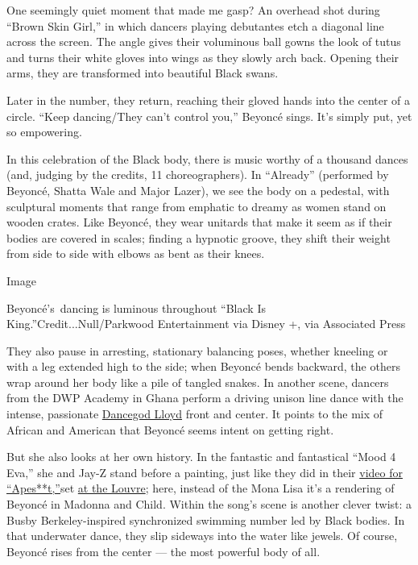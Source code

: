 One seemingly quiet moment that made me gasp? An overhead shot during
``Brown Skin Girl,'' in which dancers playing debutantes etch a diagonal
line across the screen. The angle gives their voluminous ball gowns the
look of tutus and turns their white gloves into wings as they slowly
arch back. Opening their arms, they are transformed into beautiful Black
swans.

Later in the number, they return, reaching their gloved hands into the
center of a circle. ``Keep dancing/They can't control you,'' Beyoncé
sings. It's simply put, yet so empowering.

In this celebration of the Black body, there is music worthy of a
thousand dances (and, judging by the credits, 11 choreographers). In
``Already'' (performed by Beyoncé, Shatta Wale and Major Lazer), we see
the body on a pedestal, with sculptural moments that range from emphatic
to dreamy as women stand on wooden crates. Like Beyoncé, they wear
unitards that make it seem as if their bodies are covered in scales;
finding a hypnotic groove, they shift their weight from side to side
with elbows as bent as their knees.

Image

Beyoncé's~dancing is luminous throughout ``Black Is
King.''Credit...Null/Parkwood Entertainment via Disney +, via Associated
Press

They also pause in arresting, stationary balancing poses, whether
kneeling or with a leg extended high to the side; when Beyoncé bends
backward, the others wrap around her body like a pile of tangled snakes.
In another scene, dancers from the DWP Academy in Ghana perform a
driving unison line dance with the intense, passionate
\href{https://www.instagram.com/p/CDTRa6wByKt/}{Dancegod Lloyd} front
and center. It points to the mix of African and American that Beyoncé
seems intent on getting right.

But she also looks at her own history. In the fantastic and fantastical
``Mood 4 Eva,'' she and Jay-Z stand before a painting, just like they
did in their \href{https://www.youtube.com/watch?v=kbMqWXnpXcA}{video
for ``Apes**t,''}set
\href{https://www.nytimes.com/2018/06/17/arts/design/louvre-jay-z-beyonce-video.html}{at
the Louvre}; here, instead of the Mona Lisa it's a rendering of Beyoncé
in Madonna and Child. Within the song's scene is another clever twist: a
Busby Berkeley-inspired synchronized swimming number led by Black
bodies. In that underwater dance, they slip sideways into the water like
jewels. Of course, Beyoncé rises from the center --- the most powerful
body of all.

